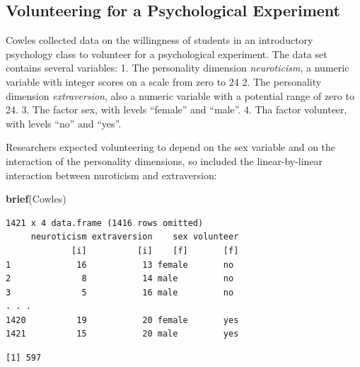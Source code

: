 \documentclass[
]{article}
\newenvironment{Shaded}{\begin{snugshade}}{\end{snugshade}}
\newcommand{\CommentTok}[1]{\textcolor[rgb]{0.56,0.35,0.01}{\textit{#1}}}
\newcommand{\KeywordTok}[1]{\textcolor[rgb]{0.13,0.29,0.53}{\textbf{#1}}}
\newcommand{\NormalTok}[1]{#1}
\newcommand{\OperatorTok}[1]{\textcolor[rgb]{0.81,0.36,0.00}{\textbf{#1}}}
\newcommand{\StringTok}[1]{\textcolor[rgb]{0.31,0.60,0.02}{#1}}
\begin{document}
\hypertarget{volunteering-for-a-psychological-experiment}{%
\subsection{Volunteering for a Psychological
Experiment}\label{volunteering-for-a-psychological-experiment}}

Cowles collected data on the willingness of students in an introductory
psychology class to volunteer for a psychological experiment. The data
set contains several variables: 1. The personality dimension
\emph{neuroticism}, a numeric variable with integer scores on a scale
from zero to 24 2. The personality dimension \emph{extraversion}, also a
numeric variable with a potential range of zero to 24. 3. The factor
sex, with levels ``female'' and ``male''. 4. Tha factor volunteer, with
levels ``no'' and ``yes''.

Researchers expected volunteering to depend on the sex variable and on
the interaction of the personality dimensions, so included the
linear-by-linear interaction between nuroticism and extraversion:

\begin{Shaded}
\begin{Highlighting}[]
\KeywordTok{brief}\NormalTok{(Cowles)}
\end{Highlighting}
\end{Shaded}

\begin{verbatim}
1421 x 4 data.frame (1416 rows omitted)
     neuroticism extraversion    sex volunteer
             [i]          [i]    [f]       [f]
1             16           13 female       no 
2              8           14 male         no 
3              5           16 male         no 
. . .                                              
1420          19           20 female       yes
1421          15           20 male         yes
\end{verbatim}

\begin{Shaded}
\end{Shaded}

\begin{verbatim}
[1] 597
\end{verbatim}
\end{document}
